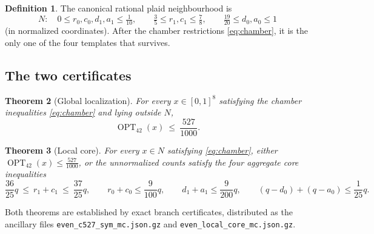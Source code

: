 \documentclass[11pt]{amsart}
\newtheorem{theorem}{Theorem}
\theoremstyle{definition}
\newtheorem{definition}[theorem]{Definition}
\theoremstyle{remark}
\newcommand{\OPT}{\operatorname{OPT}_{42}}
\newcommand{\bs}{\discretionary{}{}{}}
\begin{document}
\begin{definition}\label{def:N}
The canonical rational plaid neighbourhood is
\begin{equation}\label{eq:N}
N:\quad 0\le r_0,c_0,d_1,a_1\le\tfrac1{10},\qquad \tfrac35\le r_1,c_1\le\tfrac78,\qquad \tfrac{19}{20}\le d_0,a_0\le1
\end{equation}
(in normalized coordinates). After the chamber restrictions \eqref{eq:chamber}, it is the only one of the four templates that survives.
\end{definition}

\subsection{The two certificates}

\begin{theorem}[Global localization]\label{thm:cert1}
For every $x\in[0,1]^8$ satisfying the chamber inequalities \eqref{eq:chamber} and lying outside $N$,
\[
\OPT(x)\ \le\ \frac{527}{1000}.
\]
\end{theorem}

\begin{theorem}[Local core]\label{thm:cert2}
For every $x\in N$ satisfying \eqref{eq:chamber}, either $\OPT(x)\le\frac{527}{1000}$, or the unnormalized counts satisfy the four \emph{aggregate core} inequalities
\begin{equation}\label{eq:core}
\frac{36}{25}q\ \le\ r_1+c_1\ \le\ \frac{37}{25}q,
\qquad
r_0+c_0\le\frac{9}{100}q,
\qquad
d_1+a_1\le\frac{9}{200}q,
\qquad
(q-d_0)+(q-a_0)\le\frac{1}{25}q .
\end{equation}
\end{theorem}

Both theorems are established by exact branch certificates, distributed as the ancillary files \texttt{even\_\bs{}c527\_\bs{}sym\_\bs{}mc.json.gz} and \texttt{even\_\bs{}local\_\bs{}core\_\bs{}mc.json.gz}.
\end{document}
